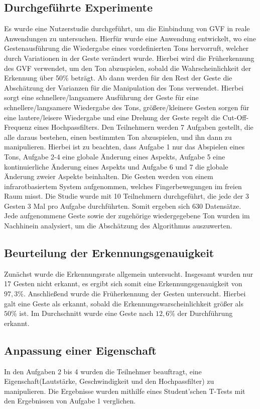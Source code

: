 \documentclass{llncs}
\begin{document}
\subsection{Durchgeführte Experimente}
Es wurde eine Nutzerstudie durchgeführt, um die Einbindung von GVF in reale Anwendungen zu untersuchen. Hierfür wurde eine Anwendung entwickelt, wo eine Gestenausführung die Wiedergabe eines vordefinierten Tons hervorruft, welcher durch Variationen in der Geste verändert wurde. Hierbei wird die Früherkennung des GVF verwendet, um den Ton abzuspielen, sobald die Wahrscheinlichkeit der Erkennung über 50\% beträgt. Ab dann werden für den Rest der Geste die Abschätzung der Varianzen für die Manipulation des Tons verwendet. Hierbei sorgt eine schnellere/langsamere Ausführung der Geste für eine schnellere/langsamere Wiedergabe des Tons, größere/kleinere Gesten sorgen für eine lautere/leisere Wiedergabe und eine Drehung der Geste regelt die Cut-Off-Frequenz eines Hochpassfilters. Den Teilnehmern werden 7 Aufgaben gestellt, die alle daraus bestehen, einen bestimmten Ton abzuspielen, und ihn dann zu manipulieren. Hierbei ist zu beachten, dass Aufgabe 1 nur das Abspielen eines Tons, Aufgabe 2-4 eine globale Änderung eines Aspekts, Aufgabe 5 eine kontinuierliche Änderung eines Aspekts und Aufgabe 6 und 7 die globale Änderung zweier Aspekte beinhalten. Die Gesten werden von einem infrarotbasiertem System aufgenommen, welches Fingerbewegungen im freien Raum misst. Die Studie wurde mit 10 Teilnehmern durchgeführt, die jede der 3 Gesten 3 Mal pro Aufgabe durchführten. Somit ergeben sich 630 Datensätze. Jede aufgenommene Geste sowie der zugehörige wiedergegebene Ton wurden im Nachhinein analysiert, um die Abschätzung des Algorithmus auszuwerten.

\subsection{Beurteilung der Erkennungsgenauigkeit}
Zunächst wurde die Erkennungsrate allgemein untersucht. Insgesamt wurden nur 17 Gesten nicht erkannt, es ergibt sich somit eine Erkennungsgenauigkeit von $97,3\%$. Anschließend wurde die Früherkennung der Gesten untersucht. Hierbei galt eine Geste als erkannt, sobald die Erkennungswarscheinlichkeit größer als $50\%$ ist. Im Durchschnitt wurde eine Geste nach $12,6\%$ der Durchführung erkannt.

\subsection{Anpassung einer Eigenschaft}
In den Aufgaben 2 bis 4 wurden die Teilnehmer beauftragt, eine Eigenschaft(Lautstärke, Geschwindigkeit und den Hochpassfilter) zu manipulieren. Die Ergebnisse wurden mithilfe eines Student'schen T-Tests mit den Ergebnissen von Aufgabe 1 verglichen.
\end{document}
